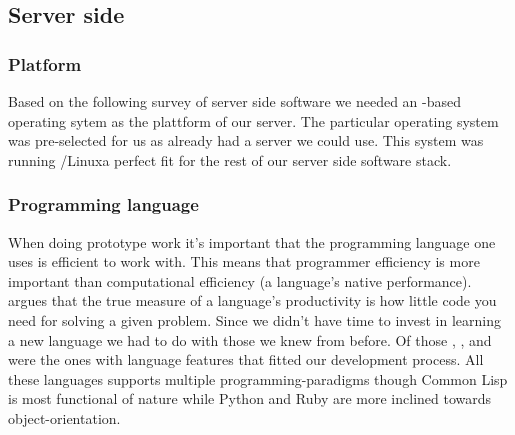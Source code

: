 \subsection{Server side}

\subsubsection{Platform}

Based on the following survey of server side software we needed an
-based operating sytem as the plattform of our server. The
particular operating system was pre-selected for us as  already
had a server we could use. This system was running %
/Linux\dash{}a perfect fit for the rest of our server side
software stack.

\subsubsection{Programming language}
\label{section:selection.stack.server.language}

When doing prototype work it's important that the programming language one
uses is efficient to work with. This means that programmer efficiency is more
important than computational efficiency (a language's native performance).
\citet{mcanally08} argues that the true measure of a language's productivity
is how little code you need for solving a given problem.
Since we didn't have time to invest in learning a new language we had to do
with those we knew from before. Of those %
,
%
, and
%
were the ones with language features that fitted our development process.
All these languages supports multiple programming-paradigms though Common
Lisp is most functional of nature  while Python and Ruby are more
inclined towards object-orientation.

